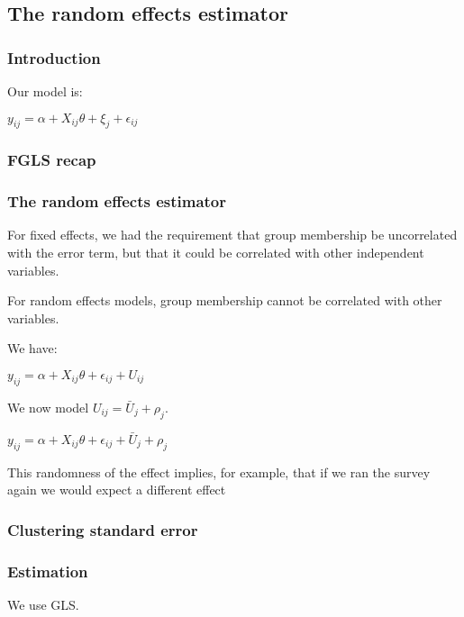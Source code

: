 
\subsection{The random effects estimator}

\subsubsection{Introduction}

Our model is:

\(y_{ij}=\alpha + X_{ij}\theta + \xi_j + \epsilon_{ij}\)

\subsubsection{FGLS recap}

\subsubsection{The random effects estimator}

For fixed effects, we had the requirement that group membership be uncorrelated with the error term, but that it could be correlated with other independent variables.

For random effects models, group membership cannot be correlated with other variables.

We have:

\(y_{ij}=\alpha + X_{ij}\theta +\epsilon_{ij}+U_{ij}\)

We now model \(U_{ij}=\bar U_{j}+\rho_j\).

\(y_{ij}=\alpha + X_{ij}\theta +\epsilon_{ij}+\bar U_{j}+\rho_j\)

This randomness of the effect implies, for example, that if we ran the survey again we would expect a different effect

\subsubsection{Clustering standard error}

\subsubsection{Estimation}

We use GLS.

